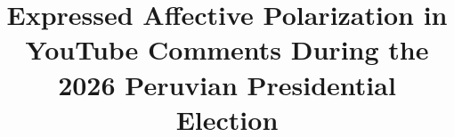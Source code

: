 \documentclass[conference,letterpaper]{IEEEtran}
\begin{document}
%
\title{Expressed Affective Polarization in YouTube Comments During the 2026 Peruvian Presidential Election}


\makeatletter
\newcommand{\linebreakand}{
  \end{@IEEEauthorhalign}
  \hfill\mbox{}\par
  \mbox{}\hfill\begin{@IEEEauthorhalign}
}
\makeatother
\author{
}





% 






\maketitle
\thispagestyle{fancy}
\end{document}

